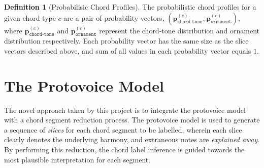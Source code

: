 \documentclass[12pt,a4paper,twoside,openany]{report} \usepackage[pdfborder={0 0 0}]{hyperref}    %
\theoremstyle{definition} \newtheorem{definition}{Definition}[section]
\begin{document}
\begin{definition}[Probabilisic Chord Profiles] 
  The probabilistic chord profiles for a given chord-type $c$ are a pair of probability vectors,
  $(\mathbf{p}^{(c)}_{\texttt{chord-tone}}, \mathbf{p}^{(c)}_{\texttt{ornament}})$, where $\mathbf{p}^{(c)}_{\texttt{chord-tone}}$ and
  $\mathbf{p}^{(c)}_{\texttt{ornament}}$ represent the chord-tone distribution and ornament distribution respectively. Each
  probability vector has the same size as the slice vectors described above, and sum of all values in each probability vector equals $1$.
\end{definition}


\section{The Protovoice Model}
\label{sec:protovoiceModel}

The novel approach taken by this project is to integrate the protovoice model with a chord segment reduction process.
The protovoice model is used to generate a sequence of \textit{slices} for each chord segment to be labelled, wherein
each slice clearly denotes the underlying harmony, and extraneous notes are \textit{explained away}. 
By performing this reduction, the chord label inference is guided towards the most plausible interpretation for each segment. 


%
%
%
\end{document}
